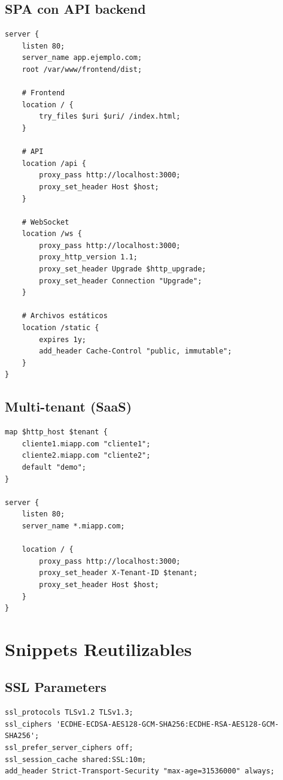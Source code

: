 \documentclass[11pt,a4paper]{article}
\begin{document}
\subsection{SPA con API backend}

\begin{lstlisting}
server {
    listen 80;
    server_name app.ejemplo.com;
    root /var/www/frontend/dist;
    
    # Frontend
    location / {
        try_files $uri $uri/ /index.html;
    }
    
    # API
    location /api {
        proxy_pass http://localhost:3000;
        proxy_set_header Host $host;
    }
    
    # WebSocket
    location /ws {
        proxy_pass http://localhost:3000;
        proxy_http_version 1.1;
        proxy_set_header Upgrade $http_upgrade;
        proxy_set_header Connection "Upgrade";
    }
    
    # Archivos estáticos
    location /static {
        expires 1y;
        add_header Cache-Control "public, immutable";
    }
}
\end{lstlisting}

\subsection{Multi-tenant (SaaS)}

\begin{lstlisting}
map $http_host $tenant {
    cliente1.miapp.com "cliente1";
    cliente2.miapp.com "cliente2";
    default "demo";
}

server {
    listen 80;
    server_name *.miapp.com;
    
    location / {
        proxy_pass http://localhost:3000;
        proxy_set_header X-Tenant-ID $tenant;
        proxy_set_header Host $host;
    }
}
\end{lstlisting}

\section{Snippets Reutilizables}

\subsection{SSL Parameters}

\begin{lstlisting}[caption=/etc/nginx/snippets/ssl-params.conf]
ssl_protocols TLSv1.2 TLSv1.3;
ssl_ciphers 'ECDHE-ECDSA-AES128-GCM-SHA256:ECDHE-RSA-AES128-GCM-SHA256';
ssl_prefer_server_ciphers off;
ssl_session_cache shared:SSL:10m;
add_header Strict-Transport-Security "max-age=31536000" always;
\end{lstlisting}
\end{document}
